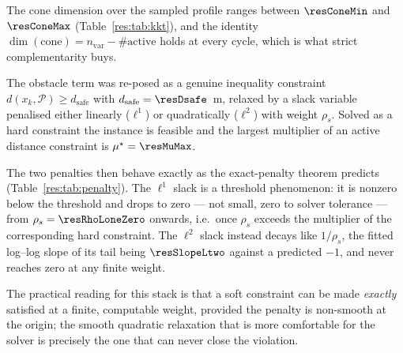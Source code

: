 The cone dimension over the sampled profile ranges between $\resConeMin$ and $\resConeMax$ (Table~\ref{res:tab:kkt}), and the identity $\dim(\text{cone}) = n_{\text{var}} - \#\text{active}$ holds at every cycle, which is what strict complementarity buys.


\label{res:penalty}


The obstacle term was re-posed as a genuine inequality constraint $d(x_k,\mathcal{P})\ge d_{\mathrm{safe}}$ with $d_{\mathrm{safe}}=\resDsafe$~m, relaxed by a slack variable penalised either linearly ($\ell^1$) or quadratically ($\ell^2$) with weight $\rho_s$. Solved as a hard constraint the instance is feasible and the largest multiplier of an active distance constraint is $\mu^\star=\resMuMax$.

The two penalties then behave exactly as the exact-penalty theorem predicts (Table~\ref{res:tab:penalty}). The $\ell^1$ slack is a threshold phenomenon: it is nonzero below the threshold and drops to zero --- not small, zero to solver tolerance --- from $\rho_s=\resRhoLoneZero$ onwards, i.e.\ once $\rho_s$ exceeds the multiplier of the corresponding hard constraint. The $\ell^2$ slack instead decays like $1/\rho_s$, the fitted log--log slope of its tail being $\resSlopeLtwo$ against a predicted $-1$, and never reaches zero at any finite weight.

The practical reading for this stack is that a soft constraint can be made \emph{exactly} satisfied at a finite, computable weight, provided the penalty is non-smooth at the origin; the smooth quadratic relaxation that is more comfortable for the solver is precisely the one that can never close the violation.


\label{res:terminal}


